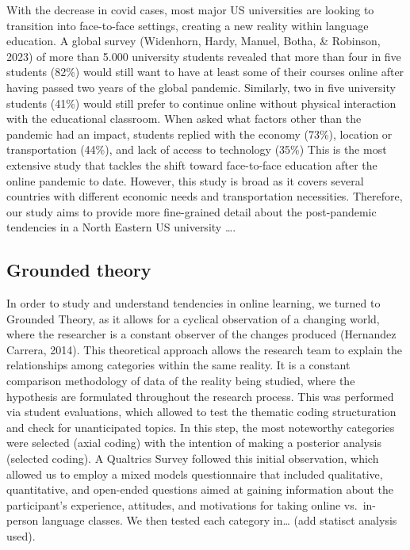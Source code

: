 \documentclass[
  man]{apa6}
\begin{document}
With the decrease in covid cases, most major US universities are looking to transition into face-to-face settings, creating a new reality within language education.
A global survey (Widenhorn, Hardy, Manuel, Botha, \& Robinson, 2023) of more than 5.000 university students revealed that more than four in five students (82\%) would still want to have at least some of their courses online after having passed two years of the global pandemic.
Similarly, two in five university students (41\%) would still prefer to continue online without physical interaction with the educational classroom.
When asked what factors other than the pandemic had an impact, students replied with the economy (73\%), location or transportation (44\%), and lack of access to technology (35\%)
This is the most extensive study that tackles the shift toward face-to-face education after the online pandemic to date.
However, this study is broad as it covers several countries with different economic needs and transportation necessities.
Therefore, our study aims to provide more fine-grained detail about the post-pandemic tendencies in a North Eastern US university \ldots.

\hypertarget{grounded-theory}{%
\subsection{Grounded theory}\label{grounded-theory}}

In order to study and understand tendencies in online learning, we turned to Grounded Theory, as it allows for a cyclical observation of a changing world, where the researcher is a constant observer of the changes produced (Hernandez Carrera, 2014).
This theoretical approach allows the research team to explain the relationships among categories within the same reality.
It is a constant comparison methodology of data of the reality being studied, where the hypothesis are formulated throughout the research process.
This was performed via student evaluations, which allowed to test the thematic coding structuration and check for unanticipated topics.
In this step, the most noteworthy categories were selected (axial coding) with the intention of making a posterior analysis (selected coding).
A Qualtrics Survey followed this initial observation, which allowed us to employ a mixed models questionnaire that included qualitative, quantitative, and open-ended questions aimed at gaining information about the participant's experience, attitudes, and motivations for taking online vs.~in-person language classes.
We then tested each category in\ldots{} (add statisct analysis used).
\end{document}
